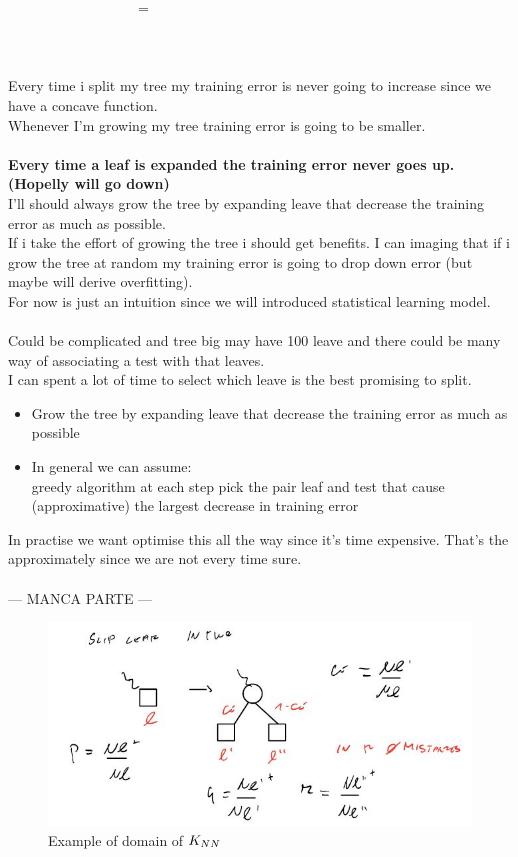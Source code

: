 \documentclass[../main.tex]{subfiles}
\begin{document}
$\qquad \qquad\qquad \qquad \quad= $ 
\\\\
\\\\
Every time i split my tree my training error is never going to increase since we
have a concave function.\\
Whenever I’m growing my tree training error is going to be smaller.\\\\
\textbf{Every time a leaf is expanded the training error never goes up.
(Hopelly will go down)}
\\
I’ll should always grow the tree by expanding leave that decrease the training
error as much as possible.\\
If i take the effort of growing the tree i should get benefits. I can imaging that if
i grow the tree at random my training error is going to drop down error (but
maybe will derive overfitting).\\
For now is just an intuition since we will introduced statistical learning model.\\\\
Could be complicated and tree big may have 100 leave and there could be
many way of associating a test with that leaves.\\
I can spent a lot of time to select which leave is the best promising to split.\\
\begin{itemize}
\item Grow the tree by expanding leave that decrease the training error as much
as possible
\item In general we can assume:\\greedy algorithm at each step pick the pair leaf and test that cause
(approximative) the largest decrease in training error\\
\end{itemize}
In practise we want optimise this all the way since it’s time expensive. That’s
the approximately since we are not every time sure.
\\\\
--- MANCA PARTE ---
\\
\begin{figure}[h]
    \centering
    \includegraphics[width=0.8\linewidth]{../img/lez5-img6.JPG}
    \caption{Example of domain of $K_{NN}$}
\end{figure}
\end{document}
